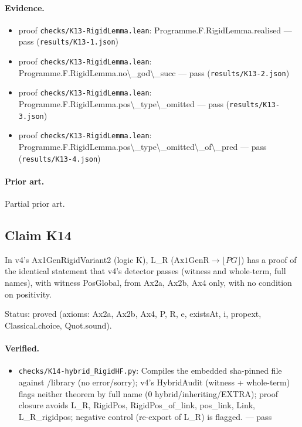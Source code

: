 \documentclass{article}
\begin{document}
\paragraph{Evidence.}
\begin{itemize}
\item proof \texttt{checks/K13-RigidLemma.lean}: Programme.F.RigidLemma.realised --- pass (\texttt{results/K13-1.json})
\item proof \texttt{checks/K13-RigidLemma.lean}: Programme.F.RigidLemma.no\textbackslash{}\_god\textbackslash{}\_succ --- pass (\texttt{results/K13-2.json})
\item proof \texttt{checks/K13-RigidLemma.lean}: Programme.F.RigidLemma.pos\textbackslash{}\_type\textbackslash{}\_omitted --- pass (\texttt{results/K13-3.json})
\item proof \texttt{checks/K13-RigidLemma.lean}: Programme.F.RigidLemma.pos\textbackslash{}\_type\textbackslash{}\_omitted\textbackslash{}\_of\textbackslash{}\_pred --- pass (\texttt{results/K13-4.json})
\end{itemize}

\paragraph{Prior art.} Partial prior art.

\subsection*{Claim K14}

In v4's Ax1GenRigidVariant2 (logic K), L\_R ($\mathrm{Ax1GenR}\to\lfloor PG\rfloor$) has a proof of the identical statement that v4's detector passes (witness and whole-term, full names), with witness PosGlobal, from Ax2a, Ax2b, Ax4 only, with no condition on positivity.

Status: proved (axioms: Ax2a, Ax2b, Ax4, P, R, e, existsAt, i, propext, Classical.choice, Quot.sound).

\paragraph{Verified.}
\begin{itemize}
\item \texttt{checks/K14-hybrid\_RigidHF.py}: Compiles the embedded sha-pinned file against /library (no error/sorry); v4's HybridAudit (witness + whole-term) flags neither theorem by full name (0 hybrid/inheriting/EXTRA); proof closure avoids L\_R, RigidPos, RigidPos\_of\_link, pos\_link, Link, L\_R\_rigidpos; negative control (re-export of L\_R) is flagged. --- pass
\end{itemize}
\end{document}
